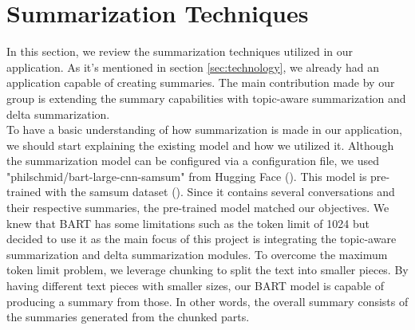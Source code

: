\section{Summarization Techniques}\label{sec:summarization}
In this section, we review the summarization techniques utilized in our application. As it's mentioned in section \ref{sec:technology}, we already had an application capable of creating summaries. The main contribution made by our group is extending the summary capabilities with topic-aware summarization and delta summarization. \\
To have a basic understanding of how summarization is made in our application, we should start explaining the existing model and how we utilized it. Although the summarization model can be configured via a configuration file, we used "philschmid/bart-large-cnn-samsum" from Hugging Face (\cite{schmid2021bart}). This model is pre-trained with the samsum dataset (\cite{samsum}). Since it contains several conversations and their respective summaries, the pre-trained model matched our objectives. We knew that BART has some limitations such as the token limit of 1024 but decided to use it as the main focus of this project is integrating the topic-aware summarization and delta summarization modules. To overcome the maximum token limit problem, we leverage chunking to split the text into smaller pieces. By having different text pieces with smaller sizes, our BART model is capable of producing a summary from those. In other words, the overall summary consists of the summaries generated from the chunked parts.
